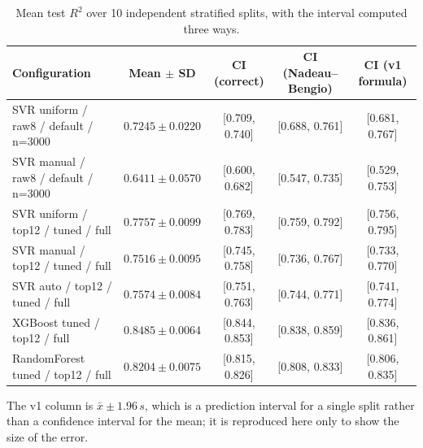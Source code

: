 \begin{table}[htbp]
\centering
\caption{Mean test $R^2$ over 10 independent stratified splits, with the interval computed three ways.}\label{tab:statistics}
\small
\begin{tabular}{lcccc}
\toprule
Configuration & Mean $\pm$ SD & CI (correct) & CI (Nadeau--Bengio) & CI (v1 formula) \\
\midrule
SVR uniform / raw8 / default / n=3000 & $0.7245 \pm 0.0220$ & [0.709, 0.740] & [0.688, 0.761] & [0.681, 0.767] \\
SVR manual / raw8 / default / n=3000 & $0.6411 \pm 0.0570$ & [0.600, 0.682] & [0.547, 0.735] & [0.529, 0.753] \\
SVR uniform / top12 / tuned / full & $0.7757 \pm 0.0099$ & [0.769, 0.783] & [0.759, 0.792] & [0.756, 0.795] \\
SVR manual / top12 / tuned / full & $0.7516 \pm 0.0095$ & [0.745, 0.758] & [0.736, 0.767] & [0.733, 0.770] \\
SVR auto / top12 / tuned / full & $0.7574 \pm 0.0084$ & [0.751, 0.763] & [0.744, 0.771] & [0.741, 0.774] \\
XGBoost tuned / top12 / full & $0.8485 \pm 0.0064$ & [0.844, 0.853] & [0.838, 0.859] & [0.836, 0.861] \\
RandomForest tuned / top12 / full & $0.8204 \pm 0.0075$ & [0.815, 0.826] & [0.808, 0.833] & [0.806, 0.835] \\
\bottomrule
\end{tabular}
\begin{flushleft}\footnotesize The v1 column is $\bar{x} \pm 1.96\,s$, which is a prediction interval for a single split rather than a confidence interval for the mean; it is reproduced here only to show the size of the error.\end{flushleft}
\end{table}